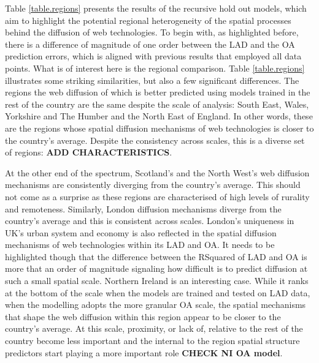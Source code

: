 \documentclass[
  authoryear,
  preprint,
  3p]{elsarticle}
\begin{document}
Table \ref{table.regions} presents the results of the recursive hold out
models, which aim to highlight the potential regional heterogeneity of
the spatial processes behind the diffusion of web technologies. To begin
with, as highlighted before, there is a difference of magnitude of one
order between the LAD and the OA prediction errors, which is aligned
with previous results that employed all data points. What is of interest
here is the regional comparison. Table \ref{table.regions} illustrates
some striking similarities, but also a few significant differences. The
regions the web diffusion of which is better predicted using models
trained in the rest of the country are the same despite the scale of
analysis: South East, Wales, Yorkshire and The Humber and the North East
of England. In other words, these are the regions whose spatial
diffusion mechanisms of web technologies is closer to the country's
average. Despite the consistency across scales, this is a diverse set of
regions: \textbf{ADD CHARACTERISTICS}.

At the other end of the spectrum, Scotland's and the North West's web
diffusion mechanisms are consistently diverging from the country's
average. This should not come as a surprise as these regions are
characterised of high levels of rurality and remoteness. Similarly,
London diffusion mechanisms diverge from the country's average and this
is consistent across scales. London's uniqueness in UK's urban system
and economy is also reflected in the spatial diffusion mechanisms of web
technologies within its LAD and OA. It needs to be highlighted though
that the difference between the RSquared of LAD and OA is more that an
order of magnitude signaling how difficult is to predict diffusion at
such a small spatial scale. Northern Ireland is an interesting case.
While it ranks at the bottom of the scale when the models are trained
and tested on LAD data, when the modelling adopts the more granular OA
scale, the spatial mechanisms that shape the web diffusion within this
region appear to be closer to the country's average. At this scale,
proximity, or lack of, relative to the rest of the country become less
important and the internal to the region spatial structure predictors
start playing a more important role \textbf{CHECK NI OA model}.
\end{document}

